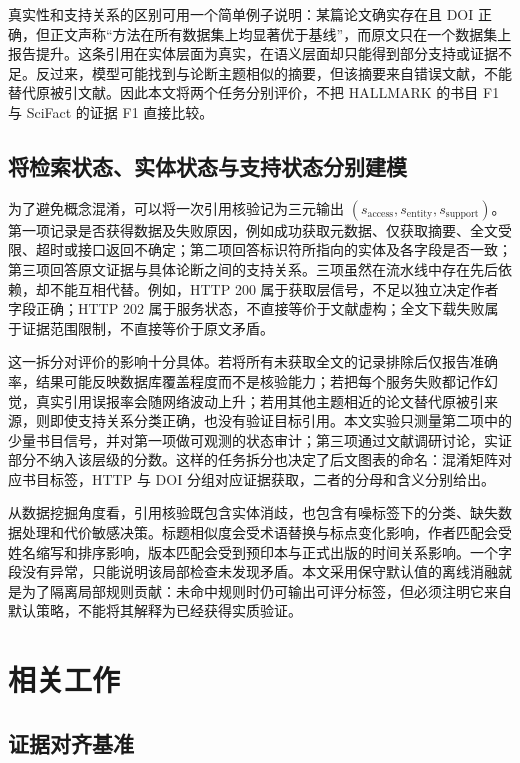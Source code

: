 \documentclass[UTF8,a4paper,11pt]{ctexart}
\begin{document}
真实性和支持关系的区别可用一个简单例子说明：某篇论文确实存在且 DOI 正确，但正文声称“方法在所有数据集上均显著优于基线”，而原文只在一个数据集上报告提升。这条引用在实体层面为真实，在语义层面却只能得到部分支持或证据不足。反过来，模型可能找到与论断主题相似的摘要，但该摘要来自错误文献，不能替代原被引文献。因此本文将两个任务分别评价，不把 HALLMARK 的书目 F1 与 SciFact 的证据 F1 直接比较。

\subsection{将检索状态、实体状态与支持状态分别建模}

为了避免概念混淆，可以将一次引用核验记为三元输出 $(s_{\mathrm{access}},s_{\mathrm{entity}},s_{\mathrm{support}})$。第一项记录是否获得数据及失败原因，例如成功获取元数据、仅获取摘要、全文受限、超时或接口返回不确定；第二项回答标识符所指向的实体及各字段是否一致；第三项回答原文证据与具体论断之间的支持关系。三项虽然在流水线中存在先后依赖，却不能互相代替。例如，HTTP 200 属于获取层信号，不足以独立决定作者字段正确；HTTP 202 属于服务状态，不直接等价于文献虚构；全文下载失败属于证据范围限制，不直接等价于原文矛盾。

这一拆分对评价的影响十分具体。若将所有未获取全文的记录排除后仅报告准确率，结果可能反映数据库覆盖程度而不是核验能力；若把每个服务失败都记作幻觉，真实引用误报率会随网络波动上升；若用其他主题相近的论文替代原被引来源，则即使支持关系分类正确，也没有验证目标引用。本文实验只测量第二项中的少量书目信号，并对第一项做可观测的状态审计；第三项通过文献调研讨论，实证部分不纳入该层级的分数。这样的任务拆分也决定了后文图表的命名：混淆矩阵对应书目标签，HTTP 与 DOI 分组对应证据获取，二者的分母和含义分别给出。

从数据挖掘角度看，引用核验既包含实体消歧，也包含有噪标签下的分类、缺失数据处理和代价敏感决策。标题相似度会受术语替换与标点变化影响，作者匹配会受姓名缩写和排序影响，版本匹配会受到预印本与正式出版的时间关系影响。一个字段没有异常，只能说明该局部检查未发现矛盾。本文采用保守默认值的离线消融就是为了隔离局部规则贡献：未命中规则时仍可输出可评分标签，但必须注明它来自默认策略，不能将其解释为已经获得实质验证。

\section{相关工作}

\subsection{证据对齐基准}
\end{document}
